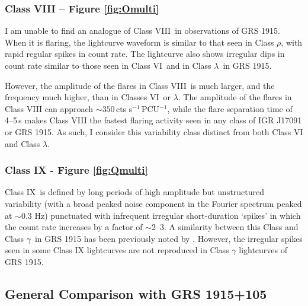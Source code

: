 \subsubsection{Class VIII -- Figure \ref{fig:Omulti}}

\par I am unable to find an analogue of Class VIII\indexviii\ in observations of GRS 1915.  When it is flaring, the lightcurve waveform is similar to that seen in Class $\rho$\indexrho, with rapid regular spikes in count rate.  The lightcurve also shows irregular dips in count rate similar to those seen in Class VI\indexvi\ and in Class $\lambda$\indexlambda\ in GRS 1915.
\par However, the amplitude of the flares in Class VIII\indexviii\ is much larger, and the frequency much higher, than in Classes VI\indexvi\ or $\lambda$\indexlambda.  The amplitude of the flares in Class VIII can approach $\sim350$\,cts s$^{-1}$\,PCU$^{-1}$, while the flare separation time of 4--5\,s makes Class VIII the fastest flaring activity seen in any class of IGR J17091 or GRS 1915.  As such, I consider this variability class distinct from both Class VI and Class $\lambda$. 

\subsubsection{Class IX - Figure \ref{fig:Qmulti}}

\label{sec:DisIX}

\par Class IX\indexix\ is defined by long periods of high amplitude but unstructured variability (with a broad peaked noise component in the Fourier spectrum peaked at $\sim$0.3 Hz) punctuated with infrequent irregular short-duration `spikes' in which the count rate increases by a factor of $\sim2$--$3$.  A similarity between this Class and Class $\gamma$\indexgamma\ in GRS 1915 has been previously noted by \citet{Altamirano_HFQPO}.  However, the irregular spikes seen in some Class IX lightcurves are not reproduced in Class $\gamma$ lightcurves of GRS 1915.

\subsection{General Comparison with GRS 1915+105}

